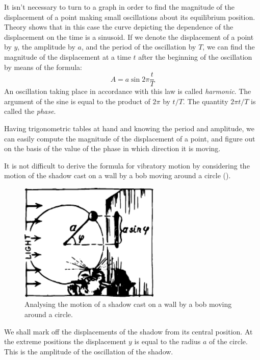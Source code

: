 It isn't necessary to turn to a graph in order to find
the magnitude of the displacement of a point making
small oscillations about its equilibrium position. Theory
shows that in this case the curve depicting the dependence
of the displacement on the time is a sinusoid. If we denote
the displacement of a point by $y$, the amplitude by $a$,
and the period of the oscillation by $T$, we can find the
magnitude of the displacement at a time $t$ after the beginning of the oscillation by means of the formula:
\begin{equation*}%
A = a \sin 2 \pi \frac{t}{T}
\end{equation*}
An oscillation taking place in accordance with this law
is called \emph{harmonic}. The argument of the sine is equal to
the product of $2\pi$ by $t/T$. The quantity $2 \pi t/T$ is called
the \emph{phase}.

Having trigonometric tables at hand and knowing the
period and amplitude, we can easily compute the magnitude of the displacement of a point, and figure out on the basis of the value of the phase in which direction it is moving.

It is not difficult to derive the formula for vibratory
motion by considering the motion of the shadow cast on a
wall by a bob moving around a circle ().

\begin{figure}[!ht]
\centering
\includegraphics[width=0.6\textwidth]{figures/fig-04-04.pdf}
\caption{Analysing the motion of a shadow cast on a wall by a bob moving around a circle.}
\label{fig-4.04}
\end{figure}

We shall mark off the displacements of the shadow from
its central position. At the extreme positions the displacement $y$ is equal to the radius $a$ of the circle. This is the amplitude of the oscillation of the shadow.

